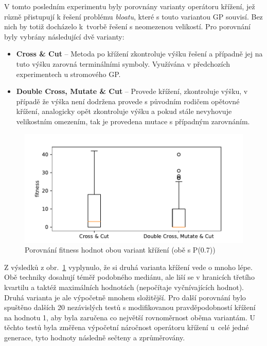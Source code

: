 V tomto posledním experimentu byly porovnány varianty operátoru křížení, jež různě přistupují k řešení problému \emph{bloatu}, které s touto variantou GP souvisí. Bez nich by totiž docházelo k~tvorbě řešení s neomezenou velikostí. Pro porovnání byly vybrány následující dvě varianty:

\begin{itemize}
    \item \textbf{Cross \& Cut} -- Metoda po křížení zkontroluje výšku řešení a případně jej na tuto výšku zarovná terminálními symboly. Využívána v předchozích experimentech u stromového GP.
    \item \textbf{Double Cross, Mutate \& Cut} -- Provede křížení, zkontroluje výšku, v případě že výška není dodržena provede s původním rodičem opětovné křížení, analogicky opět zkontroluje výšku a pokud stále nevyhovuje velikostním omezením, tak je provedena mutace s případným zarovnáním.
\end{itemize}

\begin{figure}[!h]
    \centering
    \includegraphics[scale=0.9]{obrazky-figures/exp-tgp-cross-comp.pdf}
    \caption{Porovnání fitness hodnot obou variant křížení (obě s P(0.7))}
    \label{fig:exp-tgp-cross-comp}
\end{figure}  

Z výsledků z obr.~\ref{fig:exp-tgp-cross-comp} vyplynulo, že si druhá varianta křížení vede o mnoho lépe. Obě techniky dosahují téměř podobného mediánu, ale liší se v hranicích třetího kvartilu a taktéž maximálních hodnotách (nepočítaje vyčnívajících hodnot). Druhá varianta je ale výpočetně mnohem složitější. Pro další porovnání bylo spuštěno dalších 20 nezávislých testů s modifikovanou pravděpodobností křížení na hodnotu 1, aby byla zaručena co největší rovnoměrnost oběma variantám. U těchto testů byla změřena výpočetní náročnost operátoru křížení u~celé jedné generace, tyto hodnoty následně sečteny a zprůměrovány.


